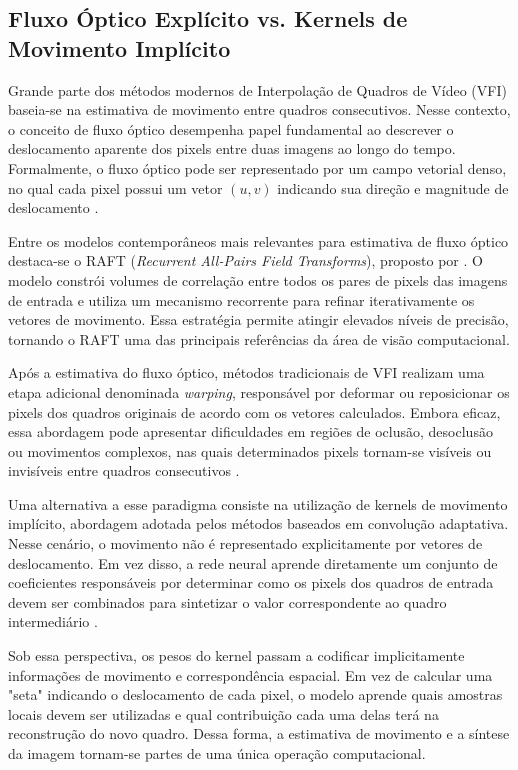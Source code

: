 \documentclass[
    12pt,                %
    openright,           %
    oneside,             %
    a4paper,             %
    english,             %
    brazil               %
]{abntex2}
\begin{document}
\subsection{Fluxo Óptico Explícito vs. Kernels de Movimento Implícito}

Grande parte dos métodos modernos de Interpolação de Quadros de Vídeo (VFI) baseia-se na estimativa de movimento entre quadros consecutivos. Nesse contexto, o conceito de fluxo óptico desempenha papel fundamental ao descrever o deslocamento aparente dos pixels entre duas imagens ao longo do tempo. Formalmente, o fluxo óptico pode ser representado por um campo vetorial denso, no qual cada pixel possui um vetor $(u,v)$ indicando sua direção e magnitude de deslocamento \cite{Szeliski2022}.

Entre os modelos contemporâneos mais relevantes para estimativa de fluxo óptico destaca-se o RAFT (\textit{Recurrent All-Pairs Field Transforms}), proposto por . O modelo constrói volumes de correlação entre todos os pares de pixels das imagens de entrada e utiliza um mecanismo recorrente para refinar iterativamente os vetores de movimento. Essa estratégia permite atingir elevados níveis de precisão, tornando o RAFT uma das principais referências da área de visão computacional.

Após a estimativa do fluxo óptico, métodos tradicionais de VFI realizam uma etapa adicional denominada \textit{warping}, responsável por deformar ou reposicionar os pixels dos quadros originais de acordo com os vetores calculados. Embora eficaz, essa abordagem pode apresentar dificuldades em regiões de oclusão, desoclusão ou movimentos complexos, nas quais determinados pixels tornam-se visíveis ou invisíveis entre quadros consecutivos \cite{Teed2020,Szeliski2022}.

Uma alternativa a esse paradigma consiste na utilização de kernels de movimento implícito, abordagem adotada pelos métodos baseados em convolução adaptativa. Nesse cenário, o movimento não é representado explicitamente por vetores de deslocamento. Em vez disso, a rede neural aprende diretamente um conjunto de coeficientes responsáveis por determinar como os pixels dos quadros de entrada devem ser combinados para sintetizar o valor correspondente ao quadro intermediário \cite{Niklaus2017}.

Sob essa perspectiva, os pesos do kernel passam a codificar implicitamente informações de movimento e correspondência espacial. Em vez de calcular uma "seta" indicando o deslocamento de cada pixel, o modelo aprende quais amostras locais devem ser utilizadas e qual contribuição cada uma delas terá na reconstrução do novo quadro. Dessa forma, a estimativa de movimento e a síntese da imagem tornam-se partes de uma única operação computacional.
\end{document}

